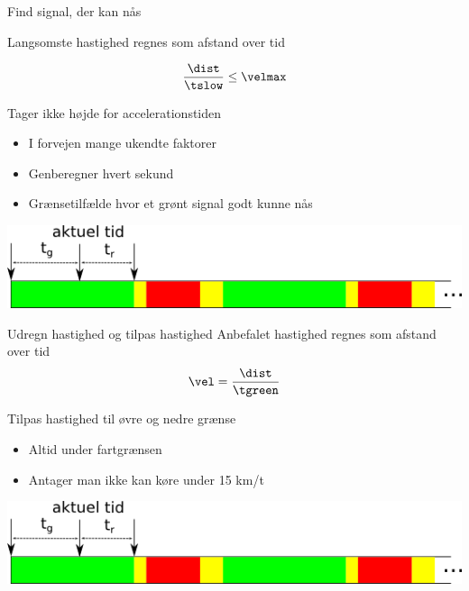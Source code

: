 \begin{frame}{Find signal, der kan nås}

Langsomste hastighed regnes som afstand over tid

\[\frac{\dist}{\tslow}\leq \velmax\]

Tager ikke højde for accelerationstiden
\begin{itemize}
\item I forvejen mange ukendte faktorer
\item Genberegner hvert sekund
\item Grænsetilfælde hvor et grønt signal godt kunne nås
\end{itemize}

\vspace{5mm}
\includegraphics[width=1\textwidth]{../images/algphases1.png}

\end{frame}


\begin{frame}{Udregn hastighed og tilpas hastighed}
Anbefalet hastighed regnes som afstand over tid
\[\vel = \frac{\dist}{\tgreen}\]

Tilpas hastighed til øvre og nedre grænse
\begin{itemize}
\item Altid under fartgrænsen
\item Antager man ikke kan køre under 15 km/t
\end{itemize}

\vspace{5mm}
\includegraphics[width=1\textwidth]{../images/algphases1.png}
\end{frame}
